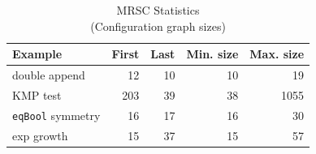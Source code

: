 \documentclass[submission,copyright,creativecommons]{eptcs}
\begin{document}
\begin{table}
  \centering
  \caption{MRSC Statistics\\(Configuration graph sizes)}\label{tbl:Stats}
  \begin{tabular}{l|r|r|r|r}
    \hline
    Example                 & First & Last & Min. size & Max. size \\ \hline
    double append           &    12 &   10 &        10 &        19 \\
    KMP test                &   203 &   39 &        38 &      1055 \\
    \verb|eqBool| symmetry  &    16 &   17 &        16 &        30 \\
    exp growth              &    15 &   37 &        15 &        57 \\
  \end{tabular}
\end{table}
\end{document}

